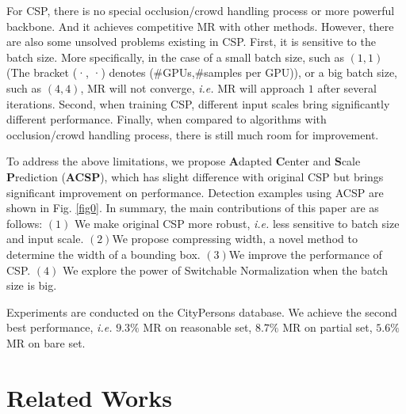 \documentclass[twocolumn]{article}
\begin{document}
For CSP\cite{liu2019high}, there is no special occlusion/crowd handling process or more powerful backbone. And it achieves competitive MR with other methods. However, there are also some unsolved problems existing 
in CSP\cite{liu2019high}. First, it is sensitive to the batch size. More specifically, in the case of a small batch size, such as $(1,1)$(The bracket (·, ·) denotes (\#GPUs,\#samples per GPU)), or a big batch size, such as $(4,4)$, MR will not converge, \textit{i.e.} MR will approach $1$ after several iterations. Second, when training CSP\cite{liu2019high}, different input scales bring significantly different performance. Finally, when compared to algorithms with occlusion/crowd handling process, there is still much room for improvement.\par 
To address the above limitations, we propose \textbf{A}dapted \textbf{C}enter and \textbf{S}cale \textbf{P}rediction (\textbf{ACSP}), which has slight difference with original CSP\cite{liu2019high} but brings significant improvement on performance. Detection examples using ACSP are shown in Fig. \ref{fig0}. In summary, the main contributions of this paper are as follows: $(1)$ We make original CSP\cite{liu2019high} more robust, \textit{i.e.} less sensitive to batch size and input scale. $(2)$We propose compressing width, a novel method to determine the width of a bounding box. $(3)$We improve the performance of CSP\cite{liu2019high}.  $(4)$ We explore the power of Switchable Normalization when the batch size is big.\par 
Experiments are conducted on the CityPersons\cite{zhang2017citypersons} database. We achieve the second best performance, \textit{i.e.} $9.3\%$ MR on reasonable set, $8.7\%$ MR on partial set, $5.6\%$ MR on bare set.

\begin{figure*}[htbp]
\centering
{}
\quad
{}
\quad
{}
\quad
{}
\caption{We use CityPersons test set to illustrate our ACSP detection ability. It is worthy to mention that, without any occlusion handling method, small and occlusion pedestrian can still be detected. The detections are shown in green rectangle boxes.}
\label{fig0}
\end{figure*}


\section{Related Works}
\end{document}
